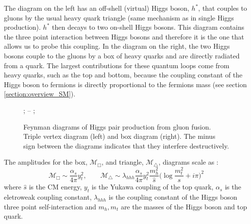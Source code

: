 
The diagram on the left has an off-shell (virtual) Higgs boson, $h^*$, that couples to gluons by the usual heavy quark triangle (same mechanism as in single Higgs production). $h^*$  then decays to two on-shell Higgs bosons. This diagram contains the three point interaction between Higgs bosons and therefore it is the one that allows us to probe this coupling. In the diagram on the right, the two Higgs bosons couple to the gluons by a box of heavy quarks and are directly radiated from a quark. The largest contributions for these quantum loops come from heavy quarks, such as the top and bottom, because the coupling constant of the Higgs boson to fermions is directly proportional to the fermions mass (see section \ref{section:overview_SM}).

\begin{figure}[h]
	\centering
	; \qquad \--- \qquad
	;
	\caption{Feynman diagrams of Higgs pair production from gluon fusion. Triple vertex diagram (left) and box diagram (right). The minus sign between the diagrams indicates that they interfere destructively.}
	\label{fig:higgs_pair}
\end{figure}


The amplitudes for the box, $\mathcal{M}_{\Box}$, and triangle, $\mathcal{M}_{\triangle}$, diagrams scale as \cite{FCCyellow}:
\begin{equation}
\mathcal{M}_{\Box} \sim \frac{\alpha_s}{4\pi} y_t^2, \qquad \mathcal{M}_{\triangle} \sim \lambda_{hhh} \frac{\alpha_s}{4\pi} y_t^2 \frac{m_h^2}{\hat{s}}\Big(\log \frac{m_t^2}{\hat{s}} + i\pi\Big)^2
\label{eq:hh_M}
\end{equation}
where $\hat{s}$ is the CM energy, $y_t$ is the Yukawa coupling of the top quark, $\alpha_s$ is the eletroweak coupling constant, $\lambda_{hhh}$ is the coupling constant of the Higgs boson three point self-interaction and $m_h, m_t$ are the masses of the Higgs boson and top quark.

